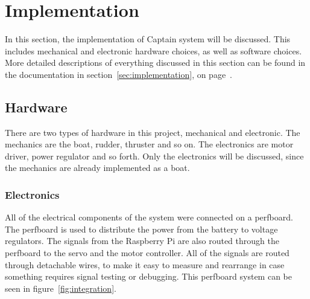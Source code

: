 \chapter{Implementation}
In this section, the implementation of Captain system will be discussed. This includes mechanical and electronic hardware choices, as well as software choices.
More detailed descriptions of everything discussed in this section can be found in the documentation in section~\ref{sec:implementation}, on page~\pageref{sec:implementation}.

\section{Hardware}
There are two types of hardware in this project, mechanical and electronic. The mechanics are the boat, rudder, thruster and so on. The electronics are motor driver, power regulator and so forth. Only the electronics will be discussed, since the mechanics are already implemented as a boat.

\subsection{Electronics}
All of the electrical components of the system were connected on a perfboard\cite{perfboard}. The perfboard is used to distribute the power from the battery to voltage regulators. The signals from the Raspberry Pi are also routed through the perfboard to the servo and the motor controller. All of the signals are routed through detachable wires, to make it easy to measure and rearrange in case something requires signal testing or debugging. This perfboard system can be seen in figure~\ref{fig:integration}. 

